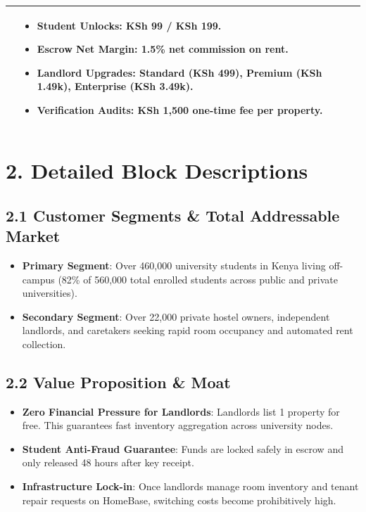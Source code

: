 \documentclass[11pt,a4paper]{article}
\begin{document}
\begin{tabularx}{\textwidth}{|X|X|X|}
{\begin{minipage}[t]{\linewidth}
\begin{itemize}[leftmargin=*,noitemsep,topsep=2pt,parsep=2pt]
\end{itemize}
\end{minipage}
} &
\begin{minipage}[t]{\linewidth}\raggedright
\begin{itemize}[leftmargin=*,noitemsep,topsep=2pt,parsep=2pt]
    \item \textbf{Student Unlocks}: KSh 99 / KSh 199.
    \item \textbf{Escrow Net Margin}: 1.5\% net commission on rent.
    \item \textbf{Landlord Upgrades}: Standard (KSh 499), Premium (KSh 1.49k), Enterprise (KSh 3.49k).
    \item \textbf{Verification Audits}: KSh 1,500 one-time fee per property.
\end{itemize}
\end{minipage}
\\
\hline
\end{tabularx}

\vspace{2em}

\section*{2. Detailed Block Descriptions}

\subsection*{2.1 Customer Segments \& Total Addressable Market}
\begin{itemize}
    \item \textbf{Primary Segment}: Over 460,000 university students in Kenya living off-campus (82\% of 560,000 total enrolled students across public and private universities).
    \item \textbf{Secondary Segment}: Over 22,000 private hostel owners, independent landlords, and caretakers seeking rapid room occupancy and automated rent collection.
\end{itemize}

\subsection*{2.2 Value Proposition \& Moat}
\begin{itemize}
    \item \textbf{Zero Financial Pressure for Landlords}: Landlords list 1 property for free. This guarantees fast inventory aggregation across university nodes.
    \item \textbf{Student Anti-Fraud Guarantee}: Funds are locked safely in escrow and only released 48 hours after key receipt.
    \item \textbf{Infrastructure Lock-in}: Once landlords manage room inventory and tenant repair requests on HomeBase, switching costs become prohibitively high.
\end{itemize}
\end{document}

